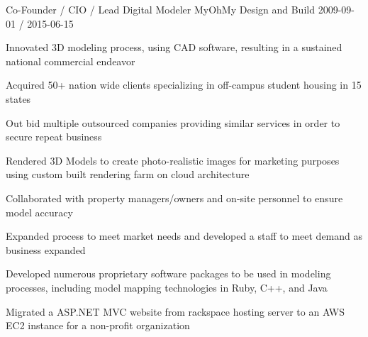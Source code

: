 \documentclass[11pt, a4paper]{awesome-cv}
\begin{document}
\begin{cventries}
  \cventry
    {Co-Founder / CIO / Lead Digital Modeler}
    {MyOhMy Design and Build}
    {}
    {2009-09-01 / 2015-06-15}
    {
          \begin{cvitems}
                \item{Innovated 3D modeling process, using CAD software, resulting in a sustained national commercial endeavor}
                    \begin{cvitemssub}
                        \item{Acquired 50+ nation wide clients specializing in off-campus student housing in 15 states}
                        \item{Out bid multiple outsourced companies providing similar services in order to secure repeat business}
                    \end{cvitemssub}
                \item{Rendered 3D Models to create photo-realistic images for marketing purposes using custom built rendering farm on cloud architecture}
                \item{Collaborated with property managers/owners and on-site personnel to ensure model accuracy}
                \item{Expanded process to meet market needs and developed a staff to meet demand as business expanded}
                    \begin{cvitemssub}
                        \item{Developed numerous proprietary software packages to be used in modeling processes, including model mapping technologies in Ruby, C++, and Java}
                    \end{cvitemssub}
                \item{Migrated a ASP.NET MVC website from rackspace hosting server to an AWS EC2 instance for a non-profit organization}
          \end{cvitems}
    }
 

\end{cventries}
\end{document}
